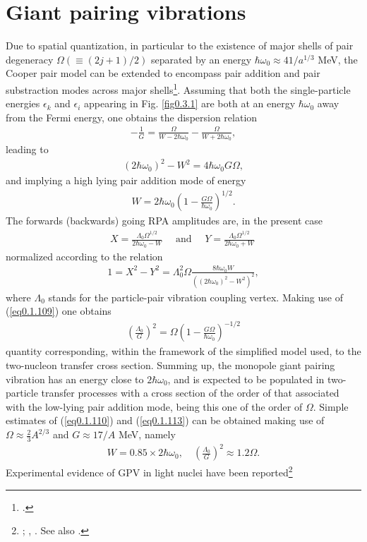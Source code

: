 \section{Giant pairing vibrations}\label{Sect2.6}
Due to spatial quantization, in particular to the existence of major shells of pair degeneracy $\Omega(\equiv(2j+1)/2)$ separated by an energy $\hbar\omega_0\approx41/a^{1/3}$ MeV, the Cooper pair model can be extended to encompass pair addition and pair substraction modes across major shells\footnote{\cite{Broglia:77}.}. Assuming that both the single-particle energies $\epsilon_k$ and $\epsilon_i$ appearing in Fig. \ref{fig0.3.1} are both at an energy    $\hbar\omega_0$ away from the Fermi energy, one obtains the dispersion relation 
\begin{align}\label{eq0.1.108}
-\frac{1}{G}=\frac{\Omega}{W-2\hbar\omega_0}-\frac{\Omega}{W+2\hbar\omega_0},
\end{align}
leading to
\begin{align}\label{eq0.1.109}
(2\hbar\omega_0)^2-W^2=4\hbar\omega_0G\Omega,
\end{align}
and implying a high lying pair addition mode of energy
\begin{align}\label{eq0.1.110}
W=2\hbar\omega_0\left(1-\frac{G\Omega}{\hbar\omega_0}\right)^{1/2}.
\end{align}
The forwards (backwards) going RPA amplitudes are, in the present case
\begin{align}\label{eq0.1.111}
X=\frac{\Lambda_0\Omega^{1/2}}{2\hbar\omega_0-W}\quad\text{ and      }\quad Y=\frac{\Lambda_0\Omega^{1/2}}{2\hbar\omega_0+W}\
\end{align}
normalized according to the relation 
\begin{align}\label{eq0.1.112}
1=X^2-Y^2=\Lambda^2_0\Omega\frac{8\hbar\omega_0W}{\left((2\hbar\omega_0)^2-W^2\right)^2},
\end{align}
where $\Lambda_0$ stands for the particle-pair vibration coupling vertex. Making use of (\ref{eq0.1.109}) one obtains
\begin{align}\label{eq0.1.113}
\left(\frac{\Lambda_0}{G}\right)^2=\Omega\left(1-\frac{G\Omega}{\hbar\omega_0}\right)^{-1/2}
\end{align}
quantity corresponding, within the framework of the simplified model used, to the two-nucleon transfer cross section. Summing up, the monopole giant pairing vibration has an energy close to $2\hbar\omega_0$, and is expected to be populated in two-particle transfer processes with a cross section of the order of that associated with the low-lying pair addition mode, being this one of the order of $\Omega$. Simple estimates of (\ref{eq0.1.110}) and (\ref{eq0.1.113}) can be obtained making use of $\Omega\approx\frac{2}{3}A^{2/3}$
and $G\approx17/A$ MeV, namely 
\begin{align}\label{eq0.1.114}
W=0.85\times2\hbar\omega_0,\quad\left(\frac{\Lambda_0}{G}\right)^2\approx1.2 \Omega.
\end{align}
Experimental evidence of GPV in light nuclei have been reported\footnote{\cite{Cappuzzello:15}; \cite{Cavallaro:19},  \cite{Bortignon:16}. See also \cite{Laskin:16,Betan:02,Dussel:09,Mouginot:11,Khan:04}.}
